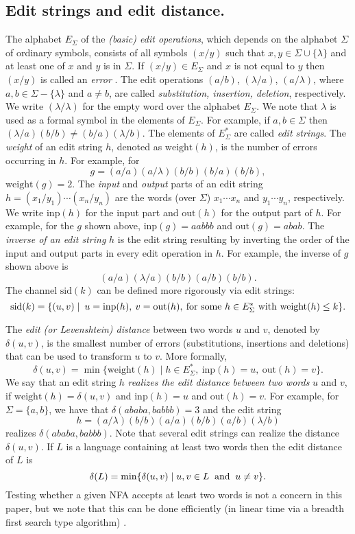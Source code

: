 \documentclass{article}
\theoremstyle{plain}
\theoremstyle{definition}
\theoremstyle{remark}
\newcommand{\e}{\lambda}
\newcommand\dsid{\ensuremath{\delta}\xspace}
\newcommand\al{\Sigma}        \newcommand\alG{\Gamma}        \newcommand\eew{(\e/\e)}        \newcommand\ealph{E_\al}   \newcommand\aut{\mathbf{a}}   \newcommand\autb{\mathbf{b}}   \newcommand\tr{\mathbf{t}}    \newcommand\sz[1]{|#1|}       \newcommand\weight[1]{\mathrm{weight}(#1)}       \newcommand\ch{\gamma}        \newcommand\chid{\mathrm{id}} \newcommand\chsid{\mathrm{sid}} \newcommand\dist{\dsid}               \newcommand\inp{\mathrm{inp}}
\newcommand\out{\mathrm{out}}
\newcommand\pssn{\par\smallskip\noindent}
\begin{document}
\subsection{Edit strings and edit distance.}
The alphabet $\ealph$ of the
\emph{(basic) edit operations}, which depends on the alphabet $\al$
of ordinary symbols, consists of all
symbols $(x/y)$ such that $x,y\in\al\cup\{\e\}$ and at least one
of $x$ and $y$ is in $\al$. If $(x/y)\in\ealph$ and $x$ is
not equal to $y$ then $(x/y)$ is called an \emph{error} \cite{KaKo:2004}.
The edit operations $(a/b)$, $(\e/a)$, $(a/\e)$,
where $a,b\in\al-\{\e\}$ and $a\not=b$,
are called \emph{substitution, insertion, deletion}, respectively.
We write $\eew$ for the empty word over the alphabet $\ealph$. We
note that $\e$ is used as a formal symbol in the elements of
$\ealph$. For example, if $a,b\in\al$ then
$(\e/a)(b/b)\not=(b/a)(\e/b)$.
The elements of $\ealph^*$ are
called \emph{edit strings}.
The {\it weight\/} of an edit string $h$, denoted as $\weight{h}$,  is the number
of errors occurring in $h$. For example, for
\begin{equation}\label{eq:edits}
g = (a/a)(a/\e)(b/b)(b/a)(b/b),
\end{equation}
$\weight{g}=2$.
The \emph{input} and \emph{output} parts of an edit
string $h=(x_1/y_1)\cdots(x_n/y_n)$ are the words (over $\al$)
$x_1\cdots x_n$ and $y_1\cdots y_n$, respectively. We write
$\inp(h)$ for the input part and $\out(h)$ for the output part of
$h$. For example, for the $g$ shown above,
$\inp(g)=aabbb$ and $\out(g)=abab$.
The \emph{inverse of an edit string} $h$ is the edit string
resulting by inverting the order of the input and output
parts in every edit operation in $h$. For example, the inverse
of $g$ shown above is
\[
(a/a)(\e/a)(b/b)(a/b)(b/b).
\]
The channel $\chsid(k)$ can be defined more rigorously via edit
strings:
\[
\chsid(k)=\{(u,v)\mid \> u=\inp(h),\>v=\out(h),\>\hbox{for some $h\in\ealph^*$ with $\weight{h}\le k$}\}.
\]
\pssn
The \emph{edit (or Levenshtein) distance} \cite{Levenshtein:66:en} between two words $u$ and
$v$, denoted by $\dist(u,v)$, is the smallest number of errors
(substitutions, insertions and deletions) that can be used to
transform $u$ to $v$. More formally,
\[
\dist(u,v)=\min\{\weight{h}\mid h\in
\ealph^*,\>\inp(h)=u,\>\out(h)=v\}.
\]
We say that an edit string $h$ \emph{realizes the edit distance
between two words} $u$ and $v$, if $\weight{h}=\dist(u,v)$ and
$\inp(h)=u$ and $\out(h)=v$.
For example, for $\al=\{a,b\}$, we have that
$\dist(ababa,babbb)=3$ and the edit string
\[
h=(a/\e)(b/b)(a/a)(b/b)(a/b)(\e/b)
\]
realizes $\dist(ababa,babbb)$.
Note that several edit strings can realize the distance $\delta(u,v)$.
If $L$ is a language containing at least two words then the edit
distance of $L$ is
\[
\dist(L)=\min\{\dist(u,v)\mid u,v\in L\>\hbox{ and }\>u\not=v\}.
\]
Testing whether a given NFA accepts at least two words is
not a concern in this paper, but we note that this can
be done efficiently (in linear time via a breadth
first search type algorithm) \cite{Yang:2012}.
\end{document}
